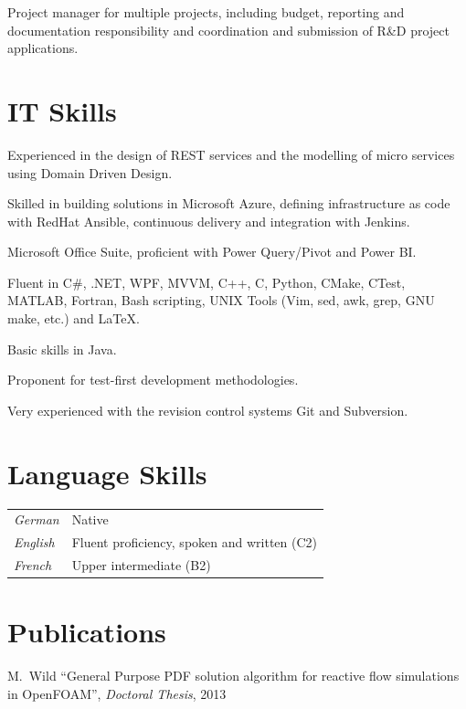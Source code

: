 \documentclass[line,11pt,a4paper]{../resume}
\begin{document}
\begin{resume}
\begin{list2}
  \item Project manager for multiple projects, including budget, reporting and
    documentation responsibility and coordination and submission of R\&D
    project applications.
\end{list2}

\section{\mysidestyle IT Skills}\vspace{6mm}
\begin{list2}
  \item Experienced in the design of REST services and the modelling of micro
    services using Domain Driven Design.
  \item Skilled in building solutions in Microsoft Azure, defining
    infrastructure as code with RedHat Ansible, continuous delivery and
    integration with Jenkins.
  \item Microsoft Office Suite, proficient with Power Query/Pivot and Power BI.
  \item Fluent in C\#, .NET, WPF, MVVM, C++, C, Python, CMake, CTest, MATLAB,
    Fortran, Bash scripting, UNIX Tools (Vim, sed, awk, grep, GNU make, etc.)
    and {\selectfont\LaTeX}.
  \item Basic skills in Java.
  \item Proponent for test-first development methodologies.
  \item Very experienced with the revision control systems Git and Subversion.
\end{list2}

\section{\mysidestyle Language Skills}\vspace{2mm}
\begin{tabular}{@{}ll}
  \textsl{German}   & Native \\
  \textsl{English}  & Fluent proficiency, spoken and written (C2) \\
  \textsl{French}  & Upper intermediate (B2) \\
\end{tabular}
\section{\mysidestyle Publications}\vspace{2mm}
M.~Wild
``General Purpose PDF solution algorithm for reactive flow simulations in
OpenFOAM'', \textsl{Doctoral Thesis}, 2013


\end{resume}
\end{document}

